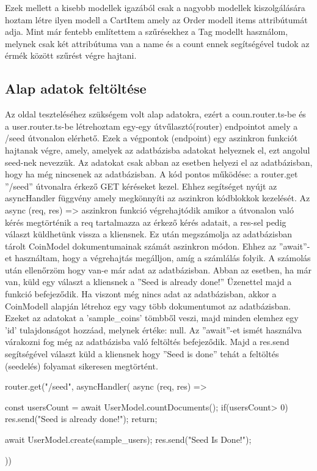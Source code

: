 Ezek mellett a kisebb modellek igazából csak a nagyobb modellek kiszolgálására hoztam létre ilyen modell a CartItem amely az Order modell items attribútumát adja. Mint már fentebb említettem a szűrésekhez a Tag modellt használom, melynek csak két attribútuma van a name és a count ennek segítségével tudok az érmék között szűrést végre hajtani.

\subsection{Alap adatok feltöltése}
Az oldal teszteléséhez szükségem volt alap adatokra, ezért a coun.router.ts-be és a user.router.ts-be létrehoztam egy-egy útvűlasztó(router) endpointot amely a /seed útvonalon elérhető. Ezek a végpontok (endpoint) egy aszinkron funkciót hajtanak végre, amely, amelyek az adatbázisba adatokat helyeznek el, ezt angolul seed-nek nevezzük. Az adatokat csak abban az esetben helyezi el az adatbázisban, hogy ha még nincsenek az adatbázisban. A kód pontos működése: a router.get ”/seed” útvonalra érkező GET kéréseket kezel. Ehhez segítséget nyújt az asyncHandler függvény amely megkönnyíti az aszinkron kódblokkok kezelését. Az async (req, res) => aszinkron funkció végrehajtódik amikor a útvonalon való kérés megtörténik a req tartalmazza az érkező kérés adatait, a res-sel pedig választ küldhetünk vissza a kliensnek. Ez után megszámolja az adatbázisban tárolt CoinModel dokumentumainak számát aszinkron módon. Ehhez az ”await”-et használtam, hogy a végrehajtás megálljon, amíg a számlálás folyik. A számolás után ellenőrzöm hogy van-e már adat az adatbázisban. Abban az esetben, ha már van, küld egy választ a kliensnek a ”Seed is already done!” Üzenettel majd a funkció befejeződik. Ha viszont még nincs adat az adatbázisban, akkor a CoinModell alapján létrehoz egy vagy több dokumentumot az adatbázisban. Ezeket az adatokat a ’sample\_coins’ tömbből veszi, majd minden elemhez egy ’id’ tulajdonságot hozzáad, melynek értéke: null. Az ”await”-et ismét használva várakozni fog még az adatbázisba való feltöltés befejeződik. Majd a res.send segítségével választ küld a kliensnek hogy ”Seed is done” tehát a feltöltés (seedelés) folyamat sikeresen megtörtént.

\begin{python}[caption={Alap adatok feltöltése},captionpos=b]
  router.get("/seed", asyncHandler(
  async (req, res) => {
     const usersCount = await UserModel.countDocuments();
     if(usersCount> 0){
       res.send("Seed is already done!");
       return;
     }
 
     await UserModel.create(sample_users);
     res.send("Seed Is Done!");
 }
 ))
\end{python}

